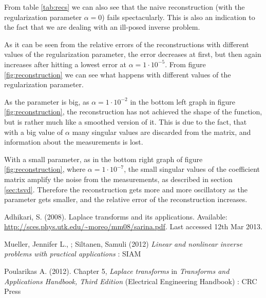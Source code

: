 \documentclass[12pt,a4]{article}
\begin{document}
From table \ref{tab:recs} we can also see that the naive reconstruction (with the regularization parameter $\alpha = 0$) fails spectacularly. This is also an indication to the fact that we are dealing with an ill-posed inverse problem.

As it can be seen from the relative errors of the reconstructions with different values of the regularization parameter, the error decreases at first, but then again increases after hitting a lowest error at $\alpha = 1 \cdot 10^{-5}$. From figure \ref{fig:reconstruction} we can see what happens with different values of the regularization parameter.

As the parameter is big, as $\alpha = 1 \cdot 10^{-2}$ in the bottom left graph in figure \ref{fig:reconstruction}, the reconstruction has not achieved the shape of the function, but is rather much like a smoothed version of it. This is due to the fact, that with a big value of $\alpha$ many singular values are discarded from the matrix, and information about the measurements is lost.

With a small parameter, as in the bottom right graph of figure \ref{fig:reconstruction}, where $\alpha = 1 \cdot 10^{-7}$, the small singular values of the coefficient matrix amplify the noise from the measurements, as described in section \ref{sec:tsvd}. Therefore the reconstruction gets more and more oscillatory as the parameter gets smaller, and the relative error of the reconstruction increases.



\newpage
\begin{thebibliography}{9}

Adhikari, S. (2008). Laplace transforms and its applications. Available: \url{http://sces.phys.utk.edu/~moreo/mm08/sarina.pdf}. Last accessed 12th Mar 2013.

Mueller, Jennifer L., ; Siltanen, Samuli (2012)
\emph{Linear and nonlinear inverse problems with practical applications} : SIAM

Poularikas A. (2012). Chapter 5, \emph{Laplace transforms} in \emph{Transforms and Applications Handbook, Third Edition} (Electrical Engineering Handbook) : CRC Press


\end{thebibliography}
\end{document}

